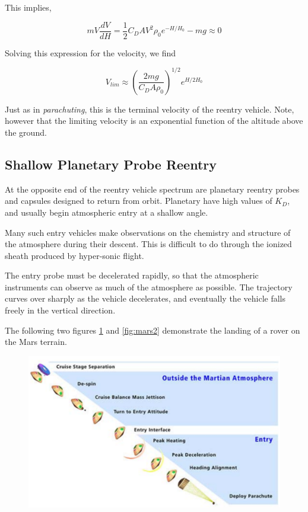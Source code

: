 \documentclass{article}
\theoremstyle{definition}
\begin{document}
This implies,

\begin{equation}
    mV \frac{dV}{dH} = \frac{1}{2} C_D A V^2 \rho_0 e^{-H/H_0} -  mg \approx 0
\end{equation}

Solving this expression for the velocity, we find

\begin{equation}
    V_{lim} \approx \left(\frac{2mg}{C_D A \rho_0} \right)^{1/2} e^{H/2H_0}
\end{equation}

Just as in \emph{parachuting}, this is the terminal velocity of the reentry vehicle.
Note, however that the limiting velocity is an exponential function of the altitude above the ground.

\subsection{Shallow Planetary Probe Reentry}

At the opposite end of the reentry vehicle spectrum are planetary reentry probes and capsules designed to return from orbit.
Planetary have high values of $K_D$, and usually begin atmospheric entry at a shallow angle. 

Many such entry vehicles make observations on the chemistry and structure of the atmosphere during their descent.
This is difficult to do through the ionized sheath produced by hyper-sonic flight.

The entry probe must be decelerated rapidly, so that the atmospheric instruments can observe as much of the atmosphere as possible. 
The trajectory curves over sharply as the vehicle decelerates, and eventually the vehicle falls freely in the vertical direction.

The following two figures \ref{fig:mars1} and \ref{fig:mars2} demonstrate the landing of a rover on the Mars terrain.

\begin{figure}[h]
    \centering
    \includegraphics[scale=0.4]{full image 21.png}
    \caption{}
    \label{fig:mars1}
\end{figure}
\end{document}
